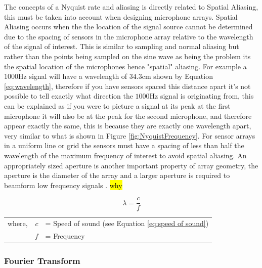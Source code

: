 \documentclass{UoNMCHA}
\numberwithin{equation}{section}
\begin{document}
    The concepts of a Nyquist rate and aliasing is directly related to Spatial Aliasing, this must be taken into account when designing microphone arrays. Spatial Aliasing occurs when the the location of the signal source cannot be determined due to the spacing of sensors in the microphone array relative to the wavelength of the signal of interest. This is similar to sampling and normal aliasing but rather than the points being sampled on the sine wave as being the problem its the spatial location of the microphones hence "spatial" aliasing. For example a $1000$Hz signal will have a wavelength of $34.3$cm shown by Equation \ref{eq:wavelength}, therefore if you have sensors spaced this distance apart it's not possible to tell exactly what direction the $1000$Hz signal is originating from, this can be explained as if you were to picture a signal at its peak at the first microphone it will also be at the peak for the second microphone, and therefore appear exactly the same, this is because they are exactly one wavelength apart, very similar to what is shown in Figure \ref{fig:NyquistFrequency}. For sensor arrays in a uniform line or grid the sensors must have a spacing of less than half the wavelength of the maximum frequency of interest to avoid spatial aliasing. An appropriately sized aperture is another important property of array geometry, the aperture is the diameter of the array and a larger aperture is required to beamform low frequency signals \citep{Ami08}. \hl{why}
	
	\begin{equation}
		\lambda = \frac{c}{f}
		\label{eq:wavelength}
	\end{equation}
	\begin{table}[H]
    \centering
        \begin{tabular}{lrl}
            where, & $c$ &= Speed of sound (see Equation \ref{eq:speed of sound}) \\
             & $f$ &= Frequency 
        \end{tabular}
    \end{table}
    
\subsubsection{Fourier Transform} \label{sec:Fourier Transform}
\end{document}
